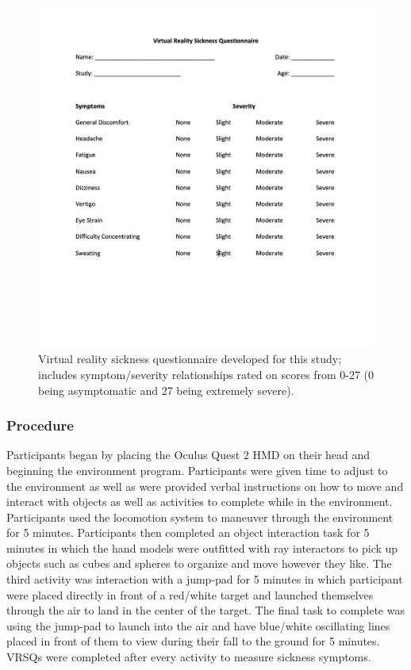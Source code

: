 \documentclass[sigconf]{acmart}
\begin{document}
\begin{figure}[h]
  \centering
  \includegraphics[width=\linewidth]{samples/VRSQ.png}
  \caption{Virtual reality sickness questionnaire developed for this study; includes symptom/severity relationships rated on scores from 0-27 (0 being asymptomatic and 27 being extremely severe).}
\end{figure}

\subsubsection{Procedure}
Participants began by placing the Oculus Quest 2 HMD on their head and beginning the environment program. Participants were given time to adjust to the environment as well as were provided verbal instructions on how to move and interact with objects as well as activities to complete while in the environment. Participants used the locomotion system to maneuver through the environment for 5 minutes. Participants then completed an object interaction task for 5 minutes in which the hand models were outfitted with ray interactors to pick up objects such as cubes and spheres to organize and move however they like. The third activity was interaction with a jump-pad for 5 minutes in which participant were placed directly in front of a red/white target and launched themselves through the air to land in the center of the target. The final task to complete was using the jump-pad to launch into the air and have blue/white oscillating lines placed in front of them to view during their fall to the ground for 5 minutes. VRSQs were completed after every activity to measure sickness symptoms. 
\end{document}
